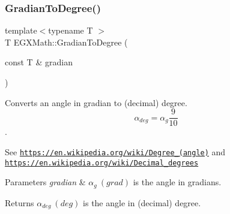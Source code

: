 \subsubsection{\texorpdfstring{Gradian\+To\+Degree()}{GradianToDegree()}}
{\footnotesize\ttfamily template$<$typename T $>$ \\
T E\+G\+X\+Math\+::\+Gradian\+To\+Degree (\begin{DoxyParamCaption}\item[{const T \&}]{gradian }\end{DoxyParamCaption})}



Converts an angle in gradian to (decimal) degree. \[\alpha_{deg}=\alpha_{g}\frac{9}{10}\]. 

See \href{https://en.wikipedia.org/wiki/Degree_(angle)}{\tt https\+://en.\+wikipedia.\+org/wiki/\+Degree\+\_\+(angle)} and \href{https://en.wikipedia.org/wiki/Decimal_degrees}{\tt https\+://en.\+wikipedia.\+org/wiki/\+Decimal\+\_\+degrees} 
\begin{DoxyParams}{Parameters}
{\em gradian} & $\alpha_{g}\ (grad)$ is the angle in gradians. \\
\hline
\end{DoxyParams}
\begin{DoxyReturn}{Returns}
$\alpha_{deg}\ (deg)$ is the angle in (decimal) degree. 
\end{DoxyReturn}
